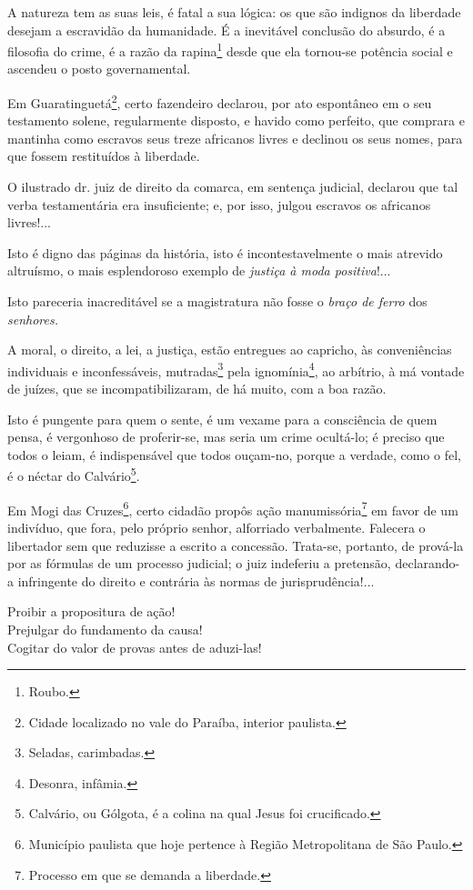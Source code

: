 A natureza tem as suas leis, é fatal a sua lógica: os que são indignos
da liberdade desejam a escravidão da humanidade. É a inevitável
conclusão do absurdo, é a filosofia do crime, é a razão da
rapina\footnote{Roubo.} desde que ela tornou-se potência social e
ascendeu o posto governamental.

Em Guaratinguetá\footnote{Cidade localizado no vale do Paraíba,
  interior paulista.}, certo fazendeiro declarou, por ato espontâneo em
o seu testamento solene, regularmente disposto, e havido como perfeito,
que comprara e mantinha como escravos seus treze africanos livres e
declinou os seus nomes, para que fossem restituídos à liberdade.

O ilustrado dr. juiz de direito da comarca, em sentença judicial,
declarou que tal verba testamentária era insuficiente; e, por isso,
julgou escravos os africanos livres!...

Isto é digno das páginas da história, isto é incontestavelmente o mais
atrevido altruísmo, o mais esplendoroso exemplo de \emph{justiça à moda
positiva}!...

Isto pareceria inacreditável se a magistratura não fosse o \emph{braço
de ferro} dos \emph{senhores.}

A moral, o direito, a lei, a justiça, estão entregues ao capricho, às
conveniências individuais e inconfessáveis, mutradas\footnote{Seladas,
  carimbadas.} pela ignomínia\footnote{Desonra, infâmia.}, ao
arbítrio, à má vontade de juízes, que se incompatibilizaram, de há
muito, com a boa razão.

Isto é pungente para quem o sente, é um vexame para a consciência de
quem pensa, é vergonhoso de proferir-se, mas seria um crime ocultá-lo; é
preciso que todos o leiam, é indispensável que todos ouçam-no, porque a
verdade, como o fel, é o néctar do Calvário\footnote{Calvário, ou
  Gólgota, é a colina na qual Jesus foi crucificado.}.

Em Mogi das Cruzes\footnote{Município paulista que hoje pertence à
  Região Metropolitana de São Paulo.}, certo cidadão propôs ação
manumissória\footnote{Processo em que se demanda a liberdade.} em
favor de um indivíduo, que fora, pelo próprio senhor, alforriado
verbalmente. Falecera o libertador sem que reduzisse a escrito a
concessão. Trata-se, portanto, de prová-la por as fórmulas de um
processo judicial; o juiz indeferiu a pretensão, declarando-a
infringente do direito e contrária às normas de jurisprudência!...

Proibir a propositura de ação!\\
Prejulgar do fundamento da causa!\\
Cogitar do valor de provas antes de aduzi-las!

